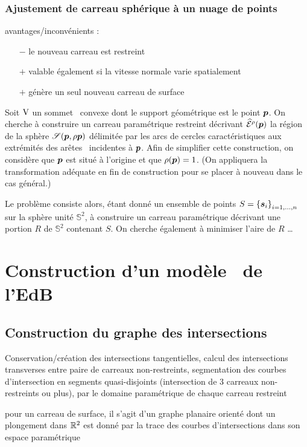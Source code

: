 \subsubsection{Ajustement de carreau sphérique à un nuage de points}
\label{section:ajustement_carreau_spherique}

\def\s{\vit{s}}

avantages/inconvénients :
\begin{itemize}
	\item[$-$] le nouveau carreau est restreint
	\item[$+$] valable également si la vitesse normale varie spatialement
	\item[$+$] génère un seul nouveau carreau de surface
\end{itemize}

Soit $\mathrm{V}$ un sommet \brep\ convexe dont le support géométrique est le point $\boldsymbol{p}$. 
On cherche à construire un carreau paramétrique restreint décrivant $\widehat{\mathcal{E}}^{\rho}({\boldsymbol{p}})$ \ie la région de la sphère $\sphere[\p][\rho{\p}]$ délimitée par les arcs de cercles caractéristiques aux extrémités des arêtes \brep\ incidentes à $\boldsymbol{p}$. 
Afin de simplifier cette construction, on considère que $\boldsymbol{p}$ est situé à l'origine et que $\rho(\boldsymbol{p}) = 1$. 
(On appliquera la transformation adéquate en fin de construction pour se placer à nouveau dans le cas général.)
\par
Le problème consiste alors, étant donné un ensemble de points $S = \family{\s}{i}{1}{n}$ sur la sphère unité $\mathbb{S}^2$, à construire un carreau paramétrique décrivant une portion $R$ de $\mathbb{S}^2$ contenant $S$. 
On cherche également à minimiser l'aire de $R$ \ldots




\section{Construction d'un modèle \brep\ de l'EdB}

\subsection{Construction du graphe des intersections}
Conservation/création des intersections tangentielles, calcul des intersections transverses entre paire de carreaux non-restreints, segmentation des courbes d'intersection en segments quasi-disjoints (intersection de 3 carreaux non-restreints ou plus),  par le domaine paramétrique de chaque carreau restreint
\par\bigskip
pour un carreau de surface, il s'agit d'un graphe planaire orienté dont un plongement dans $\mathbb{R}^2$ est donné par la trace des courbes d'intersections dans son espace paramétrique

